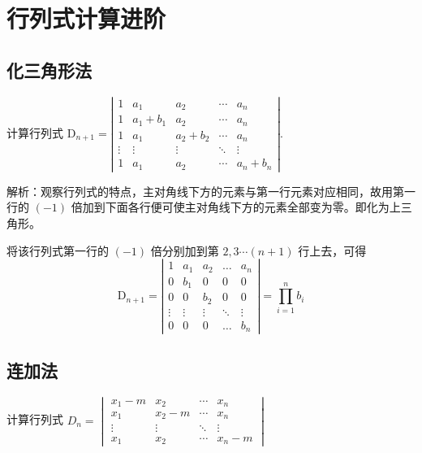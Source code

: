 \chapter{行列式计算进阶}

\section{化三角形法}
\begin{example}
    计算行列式 
    $\mathrm{D}_{n+1}=\left|\begin{array}{ccccc}
    1 & a_{1} & a_{2} & \cdots & a_{n} \\
    1 & a_{1}+b_{1} & a_{2} & \cdots & a_{n} \\
    1 & a_{1} & a_{2}+b_{2} & \cdots & a_{n} \\
    \vdots & \vdots & \vdots & \ddots & \vdots \\
    1 & a_{1} & a_{2} & \cdots & a_{n}+b_{n}
    \end{array}\right|$.
\end{example}

解析：观察行列式的特点，主对角线下方的元素与第一行元素对应相同，故用第一行的 $(-1)$ 倍加到下面各行便可使主对角线下方的元素全部变为零。即化为上三角形。

\begin{solution}
    将该行列式第一行的 $(-1)$ 倍分别加到第 $2,3 \cdots(n+1)$ 行上去，可得
    $$
    \mathrm{D}_{n+1}=\left|\begin{array}{ccccc}
    1 & a_{1} & a_{2} & \ldots & a_{n} \\
    0 & b_{1} & 0 & 0 & 0 \\
    0 & 0 & b_{2} & 0 & 0 \\
    \vdots & \vdots & \vdots & \ddots & \vdots \\
    0 & 0 & 0 & \ldots & b_{n}
    \end{array}\right|=\prod_{i=1}^nb_{i}
    $$
\end{solution}

\section{连加法}

\begin{example}
    计算行列式 
$D_{n}=\begin{vmatrix}
x_{1}-m & x_{2} & \cdots & x_{n} \\
x_{1} & x_{2}-m & \cdots & x_{n} \\
\vdots & \vdots & \ddots & \vdots \\
x_{1} & x_{2} & \cdots & x_{n}-m
\end{vmatrix}$
\end{example}

